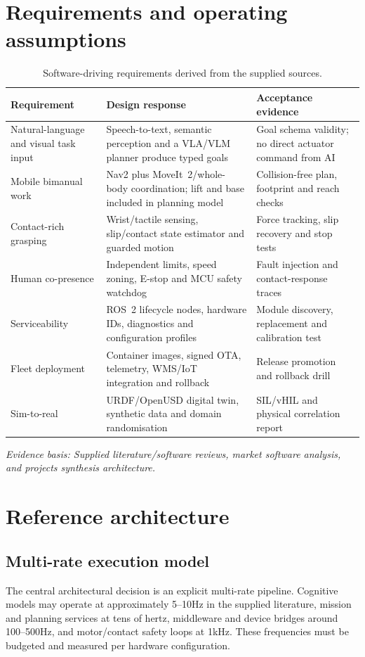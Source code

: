 \documentclass[10pt,a4paper]{article}
\newcommand{\evidence}[1]{\par\noindent\footnotesize\color{gray}\emph{Evidence basis: #1}\normalsize\par}
\begin{document}
\section{Requirements and operating assumptions}
\begin{table}[ht]
\centering\small
\caption{Software-driving requirements derived from the supplied sources.}
\begin{tabularx}{\textwidth}{@{}lYY@{}}
\toprule
Requirement & Design response & Acceptance evidence \\
\midrule
Natural-language and visual task input & Speech-to-text, semantic perception and a VLA/VLM planner produce typed goals & Goal schema validity; no direct actuator command from AI \\
Mobile bimanual work & Nav2 plus MoveIt~2/whole-body coordination; lift and base included in planning model & Collision-free plan, footprint and reach checks \\
Contact-rich grasping & Wrist/tactile sensing, slip/contact state estimator and guarded motion & Force tracking, slip recovery and stop tests \\
Human co-presence & Independent limits, speed zoning, E-stop and MCU safety watchdog & Fault injection and contact-response traces \\
Serviceability & ROS~2 lifecycle nodes, hardware IDs, diagnostics and configuration profiles & Module discovery, replacement and calibration test \\
Fleet deployment & Container images, signed OTA, telemetry, WMS/IoT integration and rollback & Release promotion and rollback drill \\
Sim-to-real & URDF/OpenUSD digital twin, synthetic data and domain randomisation & SIL/vHIL and physical correlation report \\
\bottomrule
\end{tabularx}
\evidence{Supplied literature/software reviews, market software analysis, and projects synthesis architecture.}
\end{table}

\section{Reference architecture}
\subsection{Multi-rate execution model}
The central architectural decision is an explicit multi-rate pipeline. Cognitive models may operate at approximately 5--10Hz in the supplied literature, mission and planning services at tens of hertz, middleware and device bridges around 100--500Hz, and motor/contact safety loops at 1kHz. These frequencies must be budgeted and measured per hardware configuration.
\end{document}
